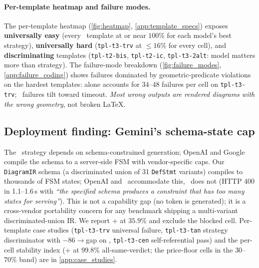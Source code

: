 \paragraph{Per-template heatmap and failure modes.}
The per-template heatmap (\cref{fig:heatmap}, \cref{app:template_specs}) exposes \textbf{universally easy} (every \tone\ template at or near $100$\% for each model's best strategy), \textbf{universally hard} (\texttt{tpl-t3-trv} at $\leq 16$\% for every cell), and \textbf{discriminating} templates (\texttt{tpl-t2-bis}, \texttt{tpl-t2-ic}, \texttt{tpl-t3-2alt}: model matters more than strategy).
The failure-mode breakdown (\cref{fig:failure_modes}, \cref{app:failure_coding}) shows failures dominated by geometric-predicate violations on the hardest templates:  alone accounts for $34$--$48$ failures per cell on \texttt{tpl-t3-trv}; \structured\ failures tilt toward timeout.
\emph{Most wrong outputs are rendered diagrams with the wrong geometry}, not broken LaTeX.

\subsection{Deployment finding: Gemini's schema-state cap}
\label{ssec:gemini_finding}

The \structured\ strategy depends on schema-constrained generation; OpenAI and Google compile the schema to a server-side FSM with vendor-specific caps.
Our \texttt{DiagramIR} schema (a discriminated union of 31 \texttt{DefStmt} variants) compiles to thousands of FSM states; OpenAI and \geminipro\ accommodate this, \geminiflash\ does not (HTTP 400 in 1.1--1.6\,s with \emph{``the specified schema produces a constraint that has too many states for serving''}).
This is not a capability gap (no token is generated); it is a cross-vendor portability concern for any benchmark shipping a multi-variant discriminated-union IR.
We report \geminiflash + \rawcode at $35.9$\% and exclude the blocked \structured cell.
Per-template case studies (\texttt{tpl-t3-trv} universal failure, \texttt{tpl-t3-tan} strategy discriminator with $-86$\pp \rawcode$\to$\structured gap on \opus, \texttt{tpl-t3-cen} self-referential pass) and the per-cell stability index (\gpt + \structured at $99.8\%$ all-same-verdict; the price-floor cells in the $30$--$70\%$ band) are in \cref{app:case_studies}.
